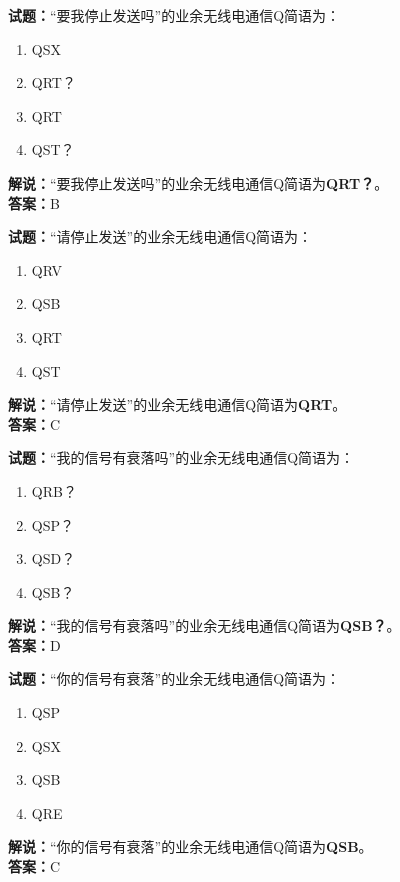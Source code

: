 \documentclass{ctexbook}
\begin{document}
\bigskip


\noindent\textbf{试题：}“要我停止发送吗”的业余无线电通信Q简语为：
\begin{enumerate}[leftmargin=3em]
\item QSX
\item QRT？
\item QRT
\item QST？
\end{enumerate}
\noindent\textbf{解说：}“要我停止发送吗”的业余无线电通信Q简语为\textbf{QRT？}。\\\noindent\textbf{答案：}B



\bigskip


\noindent\textbf{试题：}“请停止发送”的业余无线电通信Q简语为：
\begin{enumerate}[leftmargin=3em]
\item QRV
\item QSB
\item QRT
\item QST
\end{enumerate}
\noindent\textbf{解说：}“请停止发送”的业余无线电通信Q简语为\textbf{QRT}。\\\noindent\textbf{答案：}C



\bigskip


\noindent\textbf{试题：}“我的信号有衰落吗”的业余无线电通信Q简语为：
\begin{enumerate}[leftmargin=3em]
\item QRB？
\item QSP？
\item QSD？
\item QSB？
\end{enumerate}
\noindent\textbf{解说：}“我的信号有衰落吗”的业余无线电通信Q简语为\textbf{QSB？}。\\\noindent\textbf{答案：}D



\bigskip


\noindent\textbf{试题：}“你的信号有衰落”的业余无线电通信Q简语为：
\begin{enumerate}[leftmargin=3em]
\item QSP
\item QSX
\item QSB
\item QRE
\end{enumerate}
\noindent\textbf{解说：}“你的信号有衰落”的业余无线电通信Q简语为\textbf{QSB}。\\\noindent\textbf{答案：}C
\end{document}
